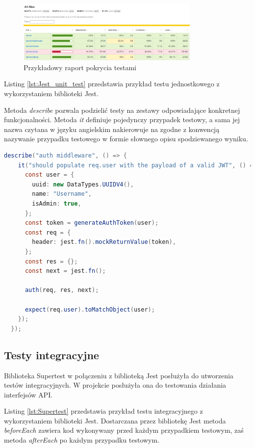 \documentclass{sprz}
\begin{document}
\begin{figure}[h]
  \centering
  \includegraphics[width=0.8\textwidth]{sprz/test_coverage}
  \caption{Przykładowy raport pokrycia testami}
  \label{img:test_coverage}
\end{figure}

Listing \ref{lst:Jest_unit_test} przedstawia przykład testu jednostkowego z wykorzystaniem biblioteki Jest.

Metoda \textit{describe} pozwala podzielić testy na zestawy odpowiadające konkretnej funkcjonalności. Metoda \textit{it} definiuje pojedynczy przypadek testowy, a sama jej nazwa czytana w języku angielskim nakierowuje na zgodne z konwencją nazywanie przypadku testowego w formie słownego opisu spodziewanego wyniku.

\begin{lstlisting}[language=Java,caption={Test jednostkowy z wykorzystaniem Jest}, label={lst:Jest_unit_test}]
  describe("auth middleware", () => {
    it("should populate req.user with the payload of a valid JWT", () => {
      const user = {
        uuid: new DataTypes.UUIDV4(),
        name: "Username",
        isAdmin: true,
      };
      const token = generateAuthToken(user);
      const req = {
        header: jest.fn().mockReturnValue(token),
      };
      const res = {};
      const next = jest.fn();
  
      auth(req, res, next);
  
      expect(req.user).toMatchObject(user);
    });
  });
\end{lstlisting}

\subsection{Testy integracyjne}

Biblioteka Supertest w połączeniu z biblioteką Jest posłużyła do utworzenia testów integracyjnych. W projekcie posłużyła ona do testowania działania interfejsów API.

Listing \ref{lst:Supertest} przedstawia przykład testu integracyjnego z wykorzystaniem biblioteki Jest. Dostarczana przez bibliotekę Jest metoda \textit{beforeEach} zawiera kod wykonywany przed każdym przypadkiem testowym, zaś metoda \textit{afterEach} po każdym przypadku testowym.
\end{document}
